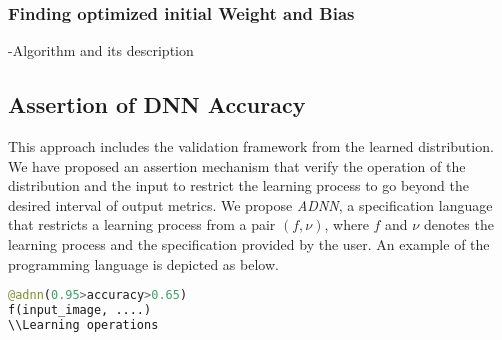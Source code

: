 \subsubsection{Finding optimized initial Weight and Bias}
-Algorithm and its description
\subsection{Assertion of DNN Accuracy}
This approach includes the validation framework from the learned distribution. We have proposed an assertion mechanism that verify the operation of the distribution and the input to restrict the learning process to go beyond the desired interval of output metrics. We propose \emph{ADNN}, a specification language that restricts a learning process from a pair $(f,\nu)$, where $f$ and $\nu$ denotes the learning process and the specification provided by the user. An example of the programming language is depicted as below.
\begin{lstlisting}[language=Python, caption=Accountable specification language]
@adnn(0.95>accuracy>0.65)
f(input_image, ....)
\\Learning operations
\end{lstlisting}